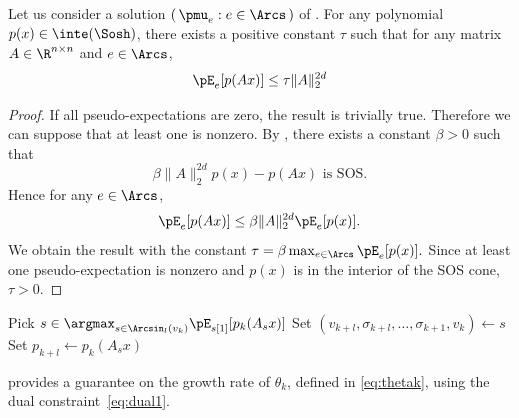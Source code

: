 \documentclass[11pt,twoside,a4paper,openright]{uclouvain-thesis}
\begin{document}
\begin{mylem}
  \label{lem:thetatoA}
  Let us consider a solution $(\, \pmu_e : e \in \Arcs \,)$ of .
  For any polynomial $p(x) \in \inte(\Sosh)$,
  there exists a positive constant $\tau$
  such that for any matrix $A \in \R^{n \times n}$ and \arc{} $e \in \Arcs$,
  \[ \pE_e[p(A x)] \leq \tau \|A\|_2^{2d} \]
  \begin{proof}
    If all pseudo-expectations are zero, the result is trivially true.
    Therefore we can suppose that at least one is nonzero.
    By , there exists a constant $\beta > 0$ such that
    \[ \beta \|A\|_2^{2d}p(x) - p(Ax) \text{ is SOS}. \]
      Hence for any \arc{} $e \in \Arcs$,
    \[
      \pE_e[p(Ax)] \leq \beta \|A\|_2^{2d} \pE_e[p(x)].
    \]
    We obtain the result with the constant
    \(
    \tau = \beta \max_{e \in \Arcs} \pE_{e}[p(x)].
    \)
    Since at least one pseudo-expectation is nonzero and $p(x)$ is in
    the interior of the SOS cone, $\tau > 0$.
  \end{proof}
\end{mylem}


\begin{algorithm}[!ht]
  \caption{Generates a sequence of large asymptotic growth.}
  \label{algo:prodl}
  \begin{algorithmic}
    \STATE Pick $s \in \argmax_{s \in \Arcsin_l(v_{k})} \pE_{s[1]}[p_k(A_s x)]$
    \STATE Set $(v_{k+l},\sigma_{k+l},\ldots,\sigma_{k+1},v_k) \leftarrow s$
    \STATE Set $p_{k+l} \leftarrow p_k(A_s x)$
    \ENDFOR
  \end{algorithmic}
\end{algorithm}




 provides a guarantee on the growth rate of $\theta_k$, defined in \eqref{eq:thetak},
using the dual constraint~\eqref{eq:dual1}.
\end{document}
